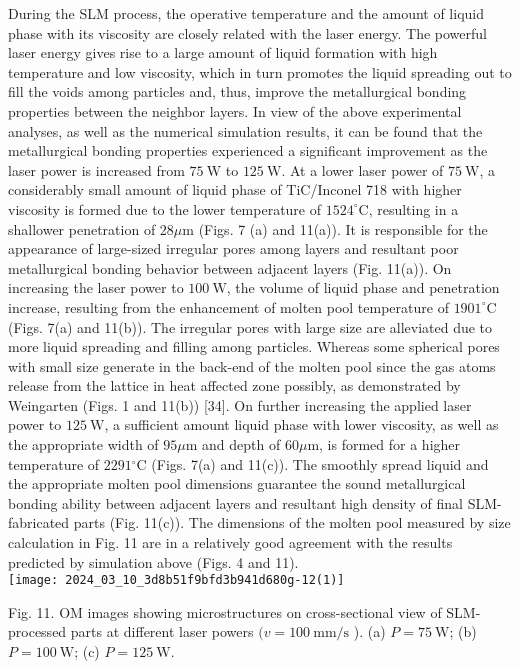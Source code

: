 \documentclass[10pt]{article}
\begin{document}
During the SLM process, the operative temperature and the amount of liquid phase with its viscosity are closely related with the laser energy. The powerful laser energy gives rise to a large amount of liquid formation with high temperature and low viscosity, which in turn promotes the liquid spreading out to fill the voids among particles and, thus, improve the metallurgical bonding properties between the neighbor layers. In view of the above experimental analyses, as well as the numerical simulation results, it can be found that the metallurgical bonding properties experienced a significant improvement as the laser power is increased from $75 \mathrm{~W}$ to $125 \mathrm{~W}$. At a lower laser power of $75 \mathrm{~W}$, a considerably small amount of liquid phase of TiC/Inconel 718 with higher viscosity is formed due to the lower temperature of $1524^{\circ} \mathrm{C}$, resulting in a shallower penetration of $28 \mu \mathrm{m}$ (Figs. 7 (a) and 11(a)). It is responsible for the appearance of large-sized irregular pores among layers and resultant poor metallurgical bonding behavior between adjacent layers (Fig. 11(a)). On increasing the laser power to $100 \mathrm{~W}$, the volume of liquid phase and penetration increase, resulting from the enhancement of molten pool temperature of $1901^{\circ} \mathrm{C}$ (Figs. 7(a) and 11(b)). The irregular pores with large size are alleviated due to more liquid spreading and filling among particles. Whereas some spherical pores with small size generate in the back-end of the molten pool since the gas atoms release from the lattice in heat affected zone possibly, as demonstrated by Weingarten (Figs. 1 and 11(b)) [34]. On further increasing the applied laser power to $125 \mathrm{~W}$, a sufficient amount liquid phase with lower viscosity, as well as the appropriate width of $95 \mu \mathrm{m}$ and depth of $60 \mu \mathrm{m}$, is formed for a higher temperature of $2291{ }^{\circ} \mathrm{C}$ (Figs. 7(a) and 11(c)). The smoothly spread liquid and the appropriate molten pool dimensions guarantee the sound metallurgical bonding ability between adjacent layers and resultant high density of final SLM-fabricated parts (Fig. 11(c)). The dimensions of the molten pool measured by size calculation in Fig. 11 are in a relatively good agreement with the results predicted by simulation above (Figs. 4 and 11).\\
\texttt{[image: 2024\_03\_10\_3d8b51f9bfd3b941d680g-12(1)]}

Fig. 11. OM images showing microstructures on cross-sectional view of SLM-processed parts at different laser powers $(v=100 \mathrm{~mm} / \mathrm{s}$ ). (a) $P=75 \mathrm{~W}$; (b) $P=100 \mathrm{~W}$; (c) $P=125 \mathrm{~W}$.
\end{document}
